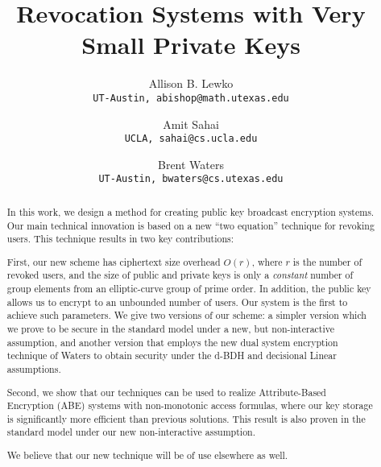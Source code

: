 \documentclass[a4paper, 11pt]{article}
\theoremstyle{definition}
\begin{document}
\newcommand{\brent}[1]{\texttt{[brent: #1]}}
\newcommand{\anote}[1]{\texttt{[Amit: #1]}}

\title{Revocation Systems with Very Small Private Keys}



\author{Allison B. Lewko %
\\ \texttt{UT-Austin, abishop@math.utexas.edu}
\and Amit Sahai %
\\ \texttt{UCLA, sahai@cs.ucla.edu}
\and Brent Waters
\\ \texttt{UT-Austin, bwaters@cs.utexas.edu}
}



\date{}
\maketitle

\begin{abstract}

In this work, we design a method for creating  public key broadcast
encryption systems. Our main technical innovation is based
on a new ``two equation'' technique for revoking users. This technique
results in two key contributions:

First, our new scheme has ciphertext size overhead $O(r)$,
where $r$ is the number of revoked users, and the size of public and
private keys is only a \emph{constant} number of group elements from
an elliptic-curve group of prime order. In addition, the public key allows
us to encrypt to an unbounded number of users. Our system is the first to
achieve such parameters. We give two versions of our scheme: a simpler version which we prove to be secure in the standard model under a new, but non-interactive assumption, and another version that employs the new dual system encryption technique of Waters to obtain security under the d-BDH and decisional Linear assumptions.

Second, we show that our techniques can be used to realize
Attribute-Based Encryption (ABE) systems with non-monotonic access
formulas, where our key storage is significantly more efficient than
previous solutions.
This result is also proven in the standard model under our new non-interactive assumption.

We believe that our new technique will be of use elsewhere as well.
\end{abstract}
\end{document}
